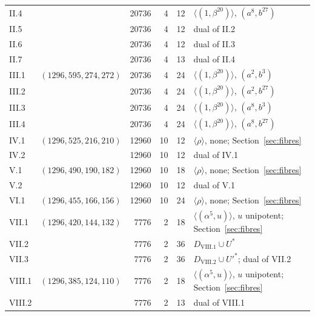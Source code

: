 \documentclass[11pt]{amsart}
\theoremstyle{definition}
\begin{document}
\begin{table}[t]
\begin{tabular}{llrrrl}
II.4 & & 20736 & 4 & 12 & $\langle(1,\beta^{20})\rangle$, $(a^8,b^{27})$ \\
II.5 & & 20736 & 4 & 12 & dual of II.2 \\
II.6 & & 20736 & 4 & 12 & dual of II.3 \\
II.7 & & 20736 & 4 & 13 & dual of II.4 \\
\midrule
III.1 & $(1296,595,274,272)$ & 20736 & 4 & 24 & $\langle(1,\beta^{20})\rangle$, $(a^2,b^{3})$ \\
III.2 & & 20736 & 4 & 24 & $\langle(1,\beta^{20})\rangle$, $(a^2,b^{27})$ \\
III.3 & & 20736 & 4 & 24 & $\langle(1,\beta^{20})\rangle$, $(a^8,b^{3})$ \\
III.4 & & 20736 & 4 & 24 & $\langle(1,\beta^{20})\rangle$, $(a^8,b^{27})$ \\
\midrule
IV.1 & $(1296,525,216,210)$ & 12960 & 10 & 12 & $\langle\rho\rangle$, none; Section~\ref{sec:fibres} \\
IV.2 & & 12960 & 10 & 12 & dual of IV.1 \\
\midrule
V.1 & $(1296,490,190,182)$ & 12960 & 10 & 18 & $\langle\rho\rangle$, none; Section~\ref{sec:fibres} \\
V.2 & & 12960 & 10 & 12 & dual of V.1 \\
\midrule
VI.1 & $(1296,455,166,156)$ & 12960 & 10 & 24 & $\langle\rho\rangle$, none; Section~\ref{sec:fibres} \\
\midrule
VII.1 & $(1296,420,144,132)$ & 7776 & 2 & 18 & $\langle(\alpha^5,u)\rangle$, $u$ unipotent; Section~\ref{sec:fibres} \\
VII.2 & & 7776 & 2 & 36 & $D_{\mathrm{VIII}.1}\cup U^*$ \\
VII.3 & & 7776 & 2 & 36 & $D_{\mathrm{VIII}.2}\cup U'^*$; dual of VII.2 \\
\midrule
VIII.1 & $(1296,385,124,110)$ & 7776 & 2 & 18 & $\langle(\alpha^5,u)\rangle$, $u$ unipotent; Section~\ref{sec:fibres} \\
VIII.2 & & 7776 & 2 & 13 & dual of VIII.1 \\
\bottomrule
\end{tabular}
\end{table}
\end{document}
